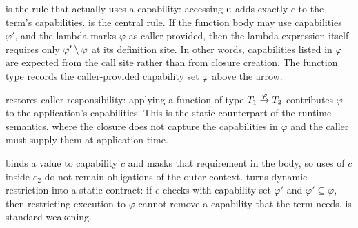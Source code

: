  is the rule that actually uses a capability: accessing $\mathbf{c}$
adds exactly $c$ to the term's capabilities. %
 is the central rule. %
If the function body may use capabilities $\varphi'$, and the lambda marks
$\varphi$ as caller-provided, then the lambda expression itself requires only
$\varphi' \setminus \varphi$ at its definition site. %
In other words, capabilities listed in $\varphi$ are expected from the call site
rather than from closure creation. %
The function type records the caller-provided capability set $\varphi$ above the
arrow. %

 restores caller responsibility: applying a function of type
$T_1 \overset{\varphi}{\rightarrow} T_2$ contributes $\varphi$ to the application's
capabilities. %
This is the static counterpart of the runtime semantics, where the closure does
not capture the capabilities in $\varphi$ and the caller must supply them at
application time. %

 binds a value to capability $c$ and masks that requirement in the
body, so uses of $c$ inside $e_2$ do not remain obligations of the outer
context. %
 turns dynamic restriction into a static contract: if $e$ checks
with capability set $\varphi'$ and $\varphi' \subseteq \varphi$, then
restricting execution to $\varphi$ cannot remove a capability that the term
needs. %
 is standard weakening. %
